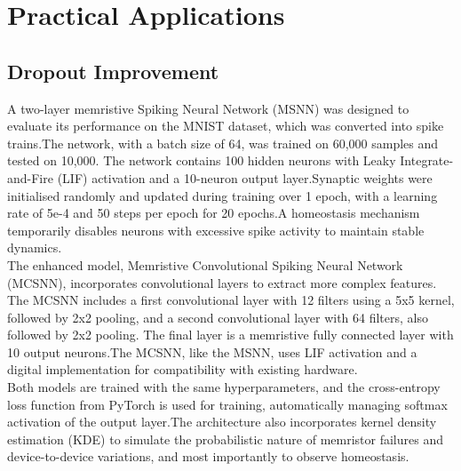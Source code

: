 \section[Practical Applications]{Practical Applications}

\subsection{Dropout Improvement}


\noindent A two-layer memristive Spiking Neural Network (MSNN) was designed to evaluate its performance on the MNIST dataset, which was converted into spike trains.The network, with a batch size of 64, was trained on 60,000 samples and tested on 10,000. The network contains 100 hidden neurons with Leaky Integrate-and-Fire (LIF) activation and a 10-neuron output layer.Synaptic weights were initialised randomly and updated during training over 1 epoch, with a learning rate of 5e-4 and 50 steps per epoch for 20 epochs.A homeostasis mechanism temporarily disables neurons with excessive spike activity to maintain stable dynamics.\\ 

\noindent The enhanced model, Memristive Convolutional Spiking Neural Network (MCSNN), incorporates convolutional layers to extract more complex features. The MCSNN includes a first convolutional layer with 12 filters using a 5x5 kernel, followed by 2x2 pooling, and a second convolutional layer with 64 filters, also followed by 2x2 pooling. The final layer is a memristive fully connected layer with 10 output neurons.The MCSNN, like the MSNN, uses LIF activation and a digital implementation for compatibility with existing hardware.\\

\noindent Both models are trained with the same hyperparameters, and the cross-entropy loss function from PyTorch is used for training, automatically managing softmax activation of the output layer.The architecture also incorporates kernel density estimation (KDE) to simulate the probabilistic nature of memristor failures and device-to-device variations, and most importantly to observe homeostasis.\\

